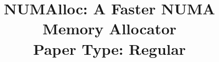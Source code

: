 \documentclass[sigconf]{acmart}
\newcommand{\todo}[1]{{\color{red}\bfseries [[#1]]}}
\begin{document}
\title{NUMAlloc: A Faster NUMA Memory Allocator \\ Paper Type: Regular} 

\date{}


\thispagestyle{empty}

\begin{abstract}

\end{abstract}

\maketitle


\thispagestyle{plain}
\pagestyle{plain}












\end{document}
